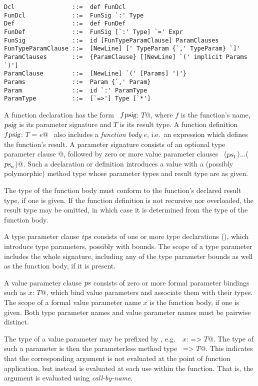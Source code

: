 \syntax\begin{lstlisting} 
Dcl                ::=  def FunDcl
FunDcl             ::=  FunSig `:' Type 
Def                ::=  def FunDef
FunDef             ::=  FunSig [`:' Type] `=' Expr 
FunSig             ::=  id [FunTypeParamClause] ParamClauses
FunTypeParamClause ::=  [NewLine] [' TypeParam {`,' TypeParam} `]' 
ParamClauses       ::=  {ParamClause} [[NewLine] `(' implicit Params `)']
ParamClause        ::=  [NewLine] `(' [Params] ')'} 
Params             ::=  Param {`,' Param}
Param              ::=  id `:' ParamType
ParamType          ::=  [`=>'] Type [`*']
\end{lstlisting}

A function declaration has the form ~\lstinline@def $f \mbox{\sl psig}$: $T$@, where
$f$ is the function's name, $\mbox{\sl psig}$ is its parameter
signature and $T$ is its result type. A function definition
~\lstinline@$f \mbox{\sl psig}$: $T$ = $e$@~ also includes a {\em function body} $e$,
i.e.\ an expression which defines the function's result.  A parameter
signature consists of an optional type parameter clause \lstinline@[$\tps\,$]@,
followed by zero or more value parameter clauses
~\lstinline@($\mbox{\sl ps}_1$)$\ldots$($\mbox{\sl ps}_n$)@.  Such a declaration or definition
introduces a value with a (possibly polymorphic) method type whose
parameter types and result type are as given.

The type of the function body must conform to the function's declared
result type, if one is given. If the function definition is not
recursive nor overloaded, the result type may be omitted, in which case
it is determined from the type of the function body.

A type parameter clause $\mbox{\sl tps}$ consists of one or more type
declarations (), which introduce type parameters,
possibly with bounds.  The scope of a type parameter includes
the whole signature, including any of the type parameter bounds as
well as the function body, if it is present.  

A value parameter clause $\mbox{\sl ps}$ consists of zero or more formal
parameter bindings such as \lstinline@$x$: $T$@, which bind value
parameters and associate them with their types.  The scope of a formal
value parameter name $x$ is the function body, if one is
given. Both type parameter names and value parameter names must be
pairwise distinct.

The type of a value parameter may be prefixed by \code{=>}, e.g.\
~\lstinline@$x$: => $T$@. The type of such a parameter is then the
parameterless method type ~\lstinline@=> $T$@. This indicates that the
corresponding argument is not evaluated at the point of function
application, but instead is evaluated at each use within the
function. That is, the argument is evaluated using {\em call-by-name}.

